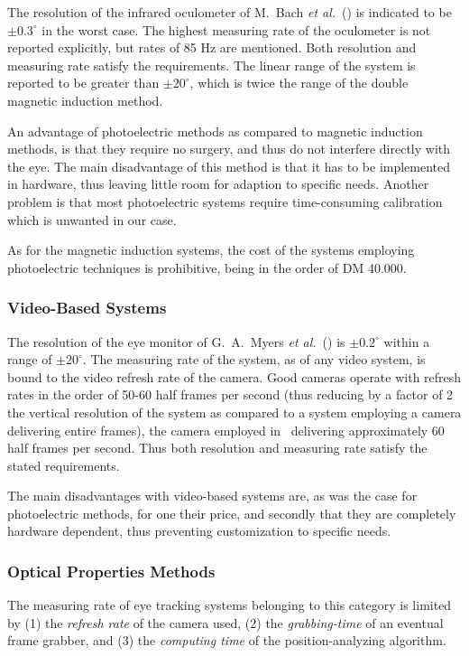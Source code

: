The resolution of the infrared oculometer of M.\ Bach {\em et
  al.\/}~(\cite{oculometer}) is indicated to be $\pm 0.3^{\circ}$ in
the worst case.  The highest measuring rate of the oculometer is not
reported explicitly, but rates of 85 Hz are mentioned.  Both
resolution and measuring rate satisfy the requirements.  The linear
range of the system is reported to be greater than $\pm 20^{\circ}$,
which is twice the range of the double magnetic induction method.

An advantage of photoelectric methods as compared to magnetic
induction methods, is that they require no surgery, and thus do not
interfere directly with the eye.  The main disadvantage of this
method is that it has to be implemented in hardware, thus leaving
little room for adaption to specific needs.  Another problem is that
most photoelectric systems require time-consuming calibration which
is unwanted in our case.

As for the magnetic induction systems, the cost of the systems
employing photoelectric techniques is prohibitive, being in the order
of DM 40.000.

\subsubsection{Video-Based Systems}

The resolution of the eye monitor of G.\ A.\ Myers {\em et
  al.\/}~(\cite{monitor}) is $\pm 0.2^{\circ}$ within a range of $\pm
20^{\circ}$.  The measuring rate of the system, as of any video system,
is bound to the video refresh rate of the camera.  Good cameras
operate with refresh rates in the order of 50-60 half frames per
second (thus reducing by a factor of 2 the vertical resolution of the
system as compared to a system employing a camera delivering entire
frames), the camera employed in~\cite{monitor} delivering
approximately 60 half frames per second.  Thus both resolution and
measuring rate satisfy the stated requirements.

The main disadvantages with video-based systems are, as was the case
for photoelectric methods, for one their price, and secondly that they
are completely hardware dependent, thus preventing customization to
specific needs.

\subsubsection{Optical Properties Methods}

The measuring rate of eye tracking systems belonging to this category
is limited by (1) the {\em refresh rate\/} of the camera used, (2) the
{\em grabbing-time\/} of an eventual frame grabber, and (3) the {\em
  computing time\/} of the position-analyzing algorithm.  


